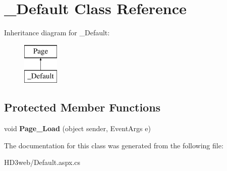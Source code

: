 \hypertarget{class___default}{\section{\+\_\+\+Default Class Reference}
\label{class___default}
}
Inheritance diagram for \+\_\+\+Default\+:\begin{figure}[H]
\begin{center}
\leavevmode
\includegraphics[height=2.000000cm]{class___default}
\end{center}
\end{figure}
\subsection*{Protected Member Functions}
\begin{DoxyCompactItemize}
\item 
\hypertarget{class___default_adacf7c92cb8d02f22ce02f0ceed897c1}{void {\bfseries Page\+\_\+\+Load} (object sender, Event\+Args e)}\label{class___default_adacf7c92cb8d02f22ce02f0ceed897c1}

\end{DoxyCompactItemize}


The documentation for this class was generated from the following file\+:\begin{DoxyCompactItemize}
\item 
H\+D3web/Default.\+aspx.\+cs\end{DoxyCompactItemize}
